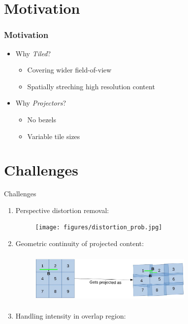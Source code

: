 \documentclass[40pt]{beamer}
\begin{document}
\section{Motivation}
\begin{frame}
\frametitle{Motivation}
\begin{itemize}
\item Why \textit{Tiled}?
\begin{itemize}
\item Covering wider field-of-view
\item  Spatially streching high resolution content\newline
\end{itemize}
\item Why \textit{Projectors}?
\begin{itemize}
\item No bezels
\item Variable tile sizes
\end{itemize}
\end{itemize}
\end{frame}

\section{Challenges}
\begin{frame}{Challenges}
\begin{enumerate}
\item Perspective distortion removal:
\begin{figure}
\texttt{[image: figures/distortion\_prob.jpg]}
\end{figure} 
\item Geometric continuity of projected content:
\begin{figure}
\includegraphics[width=8cm, height=2.5cm]{figures/continuity_prob.jpg}
\end{figure}
\item Handling intensity in overlap region:
\end{enumerate}
\end{frame}
\end{document}
